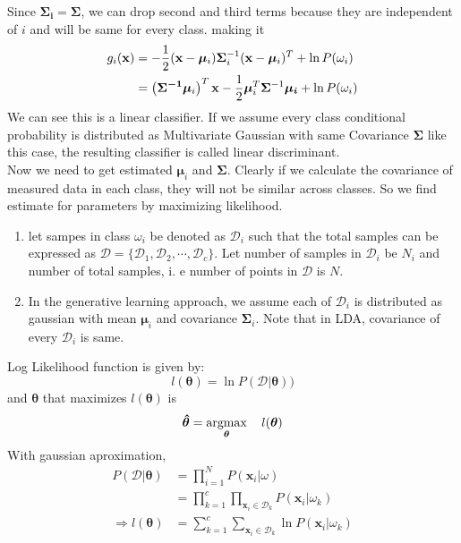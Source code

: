 \documentclass[11pt,paper=a4,answers]{exam}
\newcommand{\argmax}{\operatornamewithlimits{argmax}}
\renewcommand{\vec}[1]{\mathbf{#1}}
\begin{document}
\begin{questions}
\begin{enumerate}[i.]
        Since $\bm{\Sigma_i} = \bm{\Sigma}$, we can drop second and third terms because they are independent of $i$ and will be same for every class. making it
        \begin{align*}
            g_i(\vec{x}) &= -{1 \over 2} (\vec{x} - \bm{\mu}_i) \bm{\Sigma}_i ^{-1} (\vec{x} - \bm{\mu}_i)^T + \ln P(\omega_i)\\
            &= \left(\bm{\Sigma^{-1}} \bm{\mu}_i\right)^T \vec{x} - {1 \over 2}\bm{\mu}_i ^T \bm{\Sigma} ^{-1}\bm{\mu_i} + \ln P(\omega_i)
        \end{align*}
        We can see this is a linear classifier. If we assume every class conditional probability is distributed as Multivariate Gaussian with same Covariance $\bm{\Sigma}$ like this case, the resulting classifier is called linear discriminant.\\
        Now we need to get estimated $\bm{\mu}_i$ and $\bm{\Sigma}$. Clearly if we calculate the covariance of measured data in each class, they will not be similar across classes. So we find estimate for parameters by maximizing likelihood.
        \begin{enumerate}[]
            \item let sampes in class $\omega_i$ be denoted as $\mathcal{D}_i$ such that the total samples can be expressed as $\mathcal{D} = \{\mathcal{D}_1, \mathcal{D}_2, \cdots, \mathcal{D}_c\}$. Let number of samples in $\mathcal{D}_i$ be $N_i$ and number of total samples, i. e number of points in $\mathcal{D}$ is $N$.
            \item In the generative learning approach, we assume each of $\mathcal{D}_i$ is distributed as gaussian with mean $\bm{\mu}_i$ and covariance $\bm{\Sigma}_i$. Note that in LDA, covariance of every $\mathcal{D}_i$ is same.
        \end{enumerate}
        Log Likelihood function is given by:
        $$l(\bm{\theta}) = \ln P(\mathcal{D}| \bm{\theta}))$$
        and $\bm{\theta}$ that maximizes $l(\bm{\theta})$ is 
        $$\bm{\hat{\theta}} = \argmax_{\bm{\theta}} \quad l(\bm{\theta})$$
        With gaussian aproximation, 
        \begin{align*}
            P(\mathcal{D}| \bm{\theta}) &= \prod _{i=1}^N P(\vec{x}_i| \omega)\\
            &= \prod _{k=1}^c \prod _{\vec{x}_i \in \mathcal{D}_k} P(\vec{x}_i | \omega_k) \\ 
            \Rightarrow l(\bm{\theta}) &= \sum_{k=1}^c \sum_{\vec{x}_i \in \mathcal{D}_k} \ln P(\vec{x}_i | \omega_k) \\

\end{align*}
\end{enumerate}
\end{questions}
\end{document}
